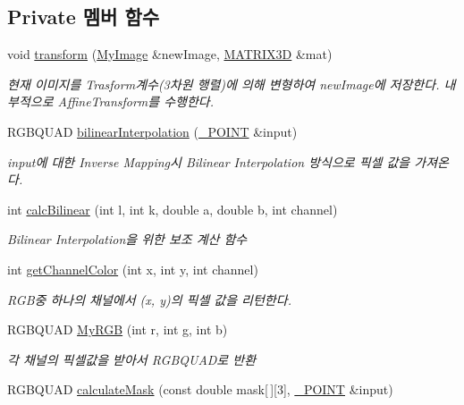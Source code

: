 \subsection*{Private 멤버 함수}
\begin{DoxyCompactItemize}
\item 
void \hyperlink{class_my_image_a12bac49a024e6c9089a88adb6edca6e1}{transform} (\hyperlink{class_my_image}{My\-Image} \&new\-Image, \hyperlink{class_m_a_t_r_i_x3_d}{M\-A\-T\-R\-I\-X3\-D} \&mat)
\begin{DoxyCompactList}\small\item\em 현재 이미지를 Trasform계수(3차원 행렬)에 의해 변형하여 new\-Image에 저장한다. 내부적으로 Affine\-Transform를 수행한다. \end{DoxyCompactList}\item 
R\-G\-B\-Q\-U\-A\-D \hyperlink{class_my_image_a596dba2536ed1ae57835bf70fcfb1b69}{bilinear\-Interpolation} (\hyperlink{class___p_o_i_n_t}{\-\_\-\-P\-O\-I\-N\-T} \&input)
\begin{DoxyCompactList}\small\item\em input에 대한 Inverse Mapping시 Bilinear Interpolation 방식으로 픽셀 값을 가져온다. \end{DoxyCompactList}\item 
int \hyperlink{class_my_image_a7b7c78fb05bb1378e8ce2a24d8cd3920}{calc\-Bilinear} (int l, int k, double a, double b, int channel)
\begin{DoxyCompactList}\small\item\em Bilinear Interpolation을 위한 보조 계산 함수 \end{DoxyCompactList}\item 
int \hyperlink{class_my_image_af8815f475d86d16653e4295b94fba5af}{get\-Channel\-Color} (int x, int y, int channel)
\begin{DoxyCompactList}\small\item\em R\-G\-B중 하나의 채널에서 (x, y)의 픽셀 값을 리턴한다. \end{DoxyCompactList}\item 
R\-G\-B\-Q\-U\-A\-D \hyperlink{class_my_image_a6deaa1ee63f0944648c18c75a6955ada}{My\-R\-G\-B} (int r, int g, int b)
\begin{DoxyCompactList}\small\item\em 각 채널의 픽셀값을 받아서 R\-G\-B\-Q\-U\-A\-D로 반환 \end{DoxyCompactList}\item 
R\-G\-B\-Q\-U\-A\-D \hyperlink{class_my_image_afec37177692c60c74d1dfba40c890642}{calculate\-Mask} (const double mask\mbox{[}$\,$\mbox{]}\mbox{[}3\mbox{]}, \hyperlink{class___p_o_i_n_t}{\-\_\-\-P\-O\-I\-N\-T} \&input)

\end{DoxyCompactItemize}

